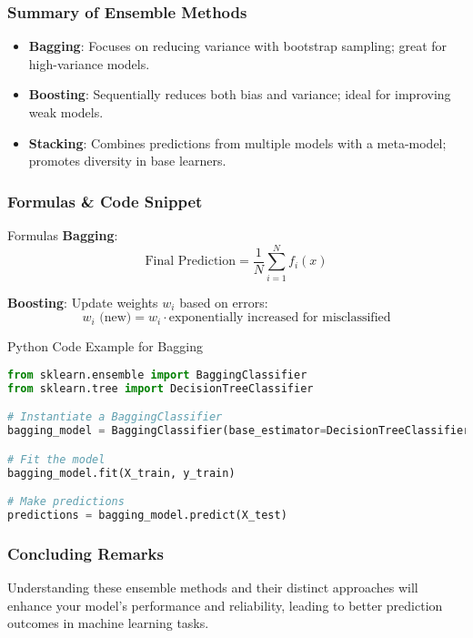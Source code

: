 \documentclass[aspectratio=169]{beamer}
\begin{document}
\begin{frame}[fragile]
  \frametitle{Summary of Ensemble Methods}
  \begin{itemize}
    \item \textbf{Bagging}: Focuses on reducing variance with bootstrap sampling; great for high-variance models.
    \item \textbf{Boosting}: Sequentially reduces both bias and variance; ideal for improving weak models.
    \item \textbf{Stacking}: Combines predictions from multiple models with a meta-model; promotes diversity in base learners.
  \end{itemize}
\end{frame}

\begin{frame}[fragile]
  \frametitle{Formulas \& Code Snippet}
  \begin{block}{Formulas}
    \textbf{Bagging}: 
    \begin{equation}
      \text{Final Prediction} = \frac{1}{N} \sum_{i=1}^{N} f_i(x)
    \end{equation}

    \textbf{Boosting}: Update weights \( w_i \) based on errors:
    \begin{equation}
      w_{i} \text{ (new)} = w_{i} \cdot \text{exponentially increased for misclassified}
    \end{equation}
  \end{block}

  \begin{block}{Python Code Example for Bagging}
    \begin{lstlisting}[language=Python]
from sklearn.ensemble import BaggingClassifier
from sklearn.tree import DecisionTreeClassifier

# Instantiate a BaggingClassifier
bagging_model = BaggingClassifier(base_estimator=DecisionTreeClassifier(), n_estimators=100)

# Fit the model
bagging_model.fit(X_train, y_train)

# Make predictions
predictions = bagging_model.predict(X_test)
    \end{lstlisting}
  \end{block}
\end{frame}

\begin{frame}[fragile]
  \frametitle{Concluding Remarks}
  Understanding these ensemble methods and their distinct approaches will enhance your model's performance and reliability, leading to better prediction outcomes in machine learning tasks.
\end{frame}
\end{document}
